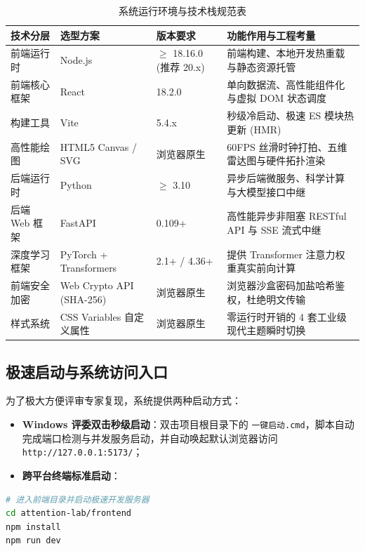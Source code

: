 \documentclass[UTF8,a4paper,11pt]{ctexart}
\begin{document}
\begin{table}[htbp]
\centering
\small
\caption{系统运行环境与技术栈规范表}
\begin{tabularx}{\textwidth}{p{3cm}p{3.2cm}p{2.5cm}X}
\toprule
\textbf{技术分层} & \textbf{选型方案} & \textbf{版本要求} & \textbf{功能作用与工程考量} \\
\midrule
前端运行时 & Node.js & $\ge$ 18.16.0 (推荐 20.x) & 前端构建、本地开发热重载与静态资源托管 \\
前端核心框架 & React & 18.2.0 & 单向数据流、高性能组件化与虚拟 DOM 状态调度 \\
构建工具 & Vite & 5.4.x & 秒级冷启动、极速 ES 模块热更新 (HMR) \\
高性能绘图 & HTML5 Canvas / SVG & 浏览器原生 & 60FPS 丝滑时钟打拍、五维雷达图与硬件拓扑渲染 \\
后端运行时 & Python & $\ge$ 3.10 & 异步后端微服务、科学计算与大模型接口中继 \\
后端 Web 框架 & FastAPI & 0.109+ & 高性能异步非阻塞 RESTful API 与 SSE 流式中继 \\
深度学习框架 & PyTorch + Transformers & 2.1+ / 4.36+ & 提供 Transformer 注意力权重真实前向计算 \\
前端安全加密 & Web Crypto API (SHA-256) & 浏览器原生 & 浏览器沙盒密码加盐哈希鉴权，杜绝明文传输 \\
样式系统 & CSS Variables 自定义属性 & 浏览器原生 & 零运行时开销的 4 套工业级现代主题瞬时切换 \\
\bottomrule
\end{tabularx}
\end{table}

\subsection{极速启动与系统访问入口}
为了极大方便评审专家复现，系统提供两种启动方式：
\begin{itemize}
    \item \textbf{Windows 评委双击秒级启动}：双击项目根目录下的 \texttt{一键启动.cmd}，脚本自动完成端口检测与并发服务启动，并自动唤起默认浏览器访问 \texttt{http://127.0.0.1:5173/}；
    \item \textbf{跨平台终端标准启动}：
\end{itemize}

\begin{lstlisting}[language=bash]
# 进入前端目录并启动极速开发服务器
cd attention-lab/frontend
npm install
npm run dev
\end{lstlisting}
\end{document}
